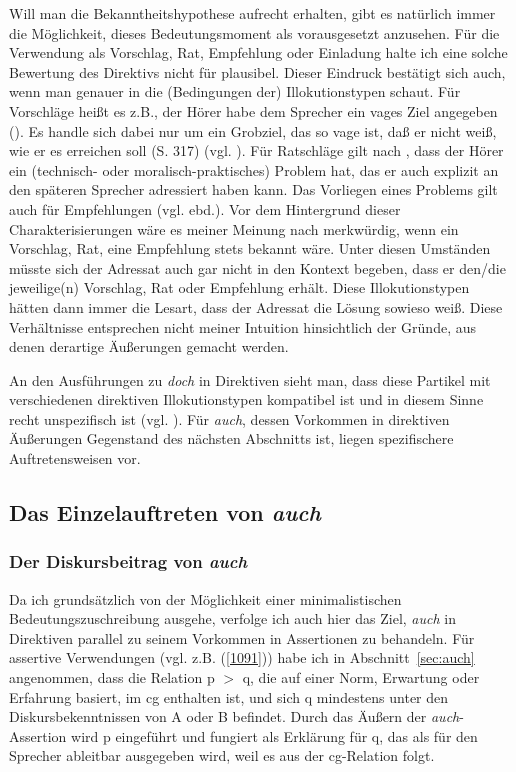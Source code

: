 {Will man die Bekanntheitshypothese aufrecht erhalten, gibt es natürlich immer die Möglichkeit, dieses Bedeutungsmoment als vorausgesetzt anzusehen. Für die Verwendung als Vorschlag, Rat, Empfehlung oder Einladung halte ich eine solche Bewertung des Direktivs nicht für plausibel. Dieser Eindruck bestätigt sich auch, wenn man genauer in die (Bedingungen der) Illokutionstypen schaut. Für Vorschläge  heißt es z.B., der Hörer habe dem Sprecher ein \glqq vages Ziel\grqq{} angegeben (\citealt[319]{Rehbein1977}). Es handle sich dabei nur um \glqq ein Grobziel\grqq{}, \glqq das so vage ist, daß er nicht weiß, wie er es erreichen soll\grqq{} (S. 317) (vgl. \citealt[186]{Rolf1997}). Für Ratschläge  gilt nach \citet[186-187]{Rolf1997}, dass der Hörer ein (technisch- oder moralisch-praktisches) Problem hat, das er auch explizit an den späteren Sprecher adressiert haben kann. Das Vorliegen eines Problems gilt auch für Empfehlungen (vgl. ebd.). Vor dem Hintergrund dieser Charakterisierungen wäre es meiner Meinung nach merkwürdig, wenn ein Vorschlag, Rat, eine Empfehlung stets bekannt wäre. Unter diesen Umständen müsste sich der Adressat auch gar nicht in den Kontext begeben, dass er den/die jeweilige(n) Vorschlag, Rat oder Empfehlung erhält. Diese Illokutions\-typen hätten dann immer die Lesart, dass der Adressat die Lösung sowieso weiß. Diese Verhältnisse entsprechen nicht meiner Intuition hinsichtlich der Gründe, aus denen derartige Äußerungen gemacht werden.  

An den Ausführungen zu \textit{doch} in Direktiven sieht man, dass diese Partikel mit verschiedenen direktiven Illokutionstypen  kompatibel ist und in diesem Sinne recht unspezifisch ist (vgl. \citealt[119]{Thurmair1989}). Für \textit{auch}, dessen Vorkommen in direktiven Äußerungen Gegenstand des nächsten Abschnitts ist, liegen spezifi\-schere Auftretensweisen vor.

\subsection{Das Einzelauftreten von \textit{auch}} 
\label{sec:dadir}
\subsubsection{Der Diskursbeitrag von \textit{auch}}
Da ich grundsätzlich von der Möglichkeit einer minimalistischen Bedeutungszu\-schreibung  ausgehe, verfolge ich auch hier das Ziel, \textit{auch} in Direktiven parallel zu seinem Vorkommen in Assertionen zu behandeln. Für assertive Verwendungen (vgl. z.B. (\ref{1091})) habe ich in Abschnitt~\ref{sec:auch} angenommen, dass die Relation p $>$ q, die auf einer Norm, Erwartung oder Erfahrung basiert, im cg enthalten ist, und sich q mindestens unter den Diskursbekenntnissen von A oder B befindet. Durch das Äußern der \textit{auch}-Assertion wird p eingeführt und fungiert als Erklärung für q, das als für den Sprecher ableitbar ausgegeben wird, weil es aus der cg-Relation folgt.
	
}
